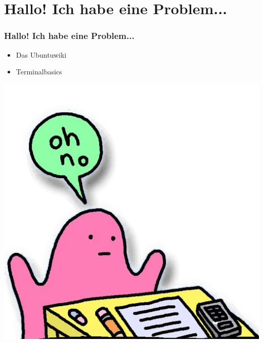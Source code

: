 \documentclass{beamer}
\begin{document}
    \section{Hallo! Ich habe eine Problem...}
        \begin{frame}
      		\frametitle{Hallo! Ich habe eine Problem...}
    		\begin{center}
        		\begin{minipage}{0.44\textwidth}
        		    \begin{itemize}
        		        \item Das Ubuntuwiki
        		        \item Terminalbasics
        		    \end{itemize}
        		\end{minipage}%
    		\end{center}
    		\hfill \includegraphics[scale=0.2]{bilder/ohno.png}
    	\end{frame}
    	
\end{document}
